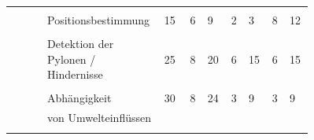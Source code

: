 \documentclass[main.tex]{subfiles} %
\begin{document}
\begin{landscape}
\begin{table}[H]
\begin{tabular}{|p{0.11\linewidth}|p{0.18\linewidth}|p{0.085\linewidth}|p{0.057\linewidth}|p{0.07\linewidth}|p{0.057\linewidth}|p{0.07\linewidth}|p{0.057\linewidth}|p{0.07\linewidth}|}
            \cline{2-9}
                                                           &                                     &                                            &                                             &                                             &   &               &   &             \\[-9pt]
                                                           & Positionsbestimmung                 & 15                                         & 6                                           & 9                                           & 2 & 3             & 8 & 12          \\[1pt]
            \cline{2-9}
                                                           &                                     &                                            &                                             &                                             &   &               &   &             \\[-9pt]
                                                           & Detektion der Pylonen / Hindernisse & 25                                         & 8                                           & 20                                          & 6 & 15            & 6 & 15          \\[1pt]
            \cline{2-9}
                                                           &                                     &                                            &                                             &                                             &   &               &   &             \\[-9pt]
                                                           & Abhängigkeit                        & 30                                         & 8                                           & 24                                          & 3 & 9             & 3 & 9           \\[1pt]
                                                           & von Umwelteinflüssen                &                                            &                                             &                                             &   &               &   &             \\[1pt]
            \cline{2-9}
                                                           &                                     &                                            &                                             &                                             &   &               &   &             \\[-9pt]

\end{tabular}
\end{table}
\end{landscape}
\end{document}
